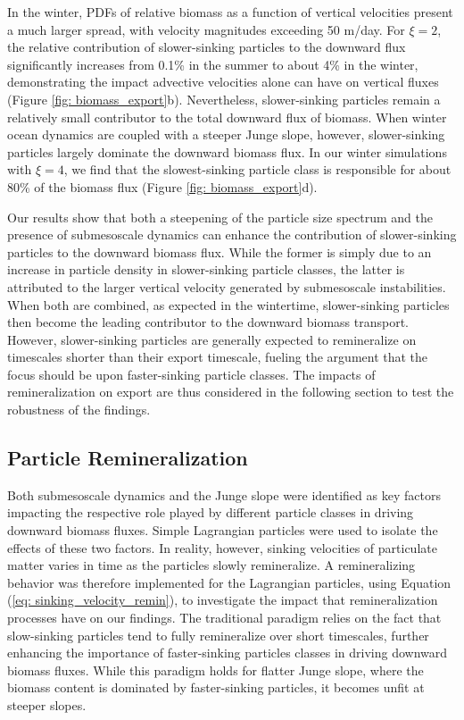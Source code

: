 \documentclass[article,linenumbers]{agujournal2018}
\begin{document}
	In the winter, PDFs of relative biomass as a function of vertical velocities present a much larger spread, with velocity magnitudes exceeding 50 m/day. For $\xi = 2$, the relative contribution of slower-sinking particles to the downward flux significantly increases from 0.1\% in the summer to about 4\% in the winter, demonstrating the impact advective velocities alone can have on vertical fluxes (Figure \ref{fig: biomass_export}b). Nevertheless, slower-sinking particles remain a relatively small contributor to the total downward flux of biomass. When winter ocean dynamics are coupled with a steeper Junge slope, however, slower-sinking particles largely dominate the downward biomass flux. In our winter simulations with $\xi = 4$, we find that the slowest-sinking particle class is responsible for about 80\% of the biomass flux (Figure \ref{fig: biomass_export}d).
	
	Our results show that both a steepening of the particle size spectrum and the presence of submesoscale dynamics can enhance the contribution of slower-sinking particles to the downward biomass flux. While the former is simply due to an increase in particle density in slower-sinking particle classes, the latter is attributed to the larger vertical velocity generated by submesoscale instabilities. When both are combined, as expected in the wintertime, slower-sinking particles then become the leading contributor to the downward biomass transport. However, slower-sinking particles are generally expected to remineralize on timescales shorter than their export timescale, fueling the argument that the focus should be upon faster-sinking particle classes. The impacts of remineralization on export are thus considered in the following section to test the robustness of the findings.
	
	\subsection{Particle Remineralization}
	\label{sec: results_remin}
	
	Both submesoscale dynamics and the Junge slope were identified as key factors impacting the respective role played by different particle classes in driving downward biomass fluxes. Simple Lagrangian particles were used to isolate the effects of these two factors. In reality, however, sinking velocities of particulate matter varies in time as the particles slowly remineralize. A remineralizing behavior was therefore implemented for the Lagrangian particles, using Equation (\ref{eq: sinking_velocity_remin}), to investigate the impact that remineralization processes have on our findings. The traditional paradigm relies on the fact that slow-sinking particles tend to fully remineralize over short timescales, further enhancing the importance of faster-sinking particles classes in driving downward biomass fluxes. While this paradigm holds for flatter Junge slope, where the biomass content is dominated by faster-sinking particles, it becomes unfit at steeper slopes. 
	
\end{document}
